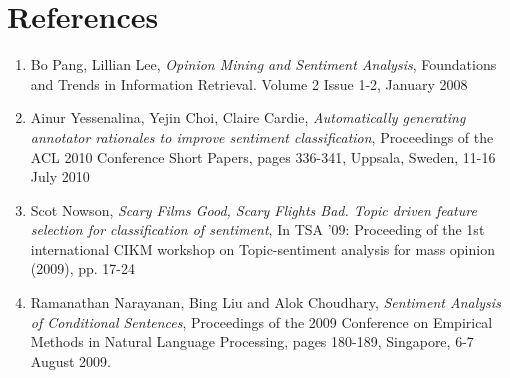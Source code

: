 \documentclass[11pt]{article}
\begin{document}
\section{References}
\begin{enumerate}
\item Bo Pang, Lillian Lee, \emph{Opinion Mining and Sentiment Analysis}, Foundations and Trends in Information Retrieval. Volume 2 Issue 1-2, January 2008
\item Ainur Yessenalina, Yejin Choi, Claire Cardie, \emph{Automatically generating annotator rationales to improve sentiment classification}, Proceedings of the ACL 2010 Conference Short Papers, pages 336-341, Uppsala, Sweden, 11-16 July 2010
\item Scot Nowson, \emph{Scary Films Good, Scary Flights Bad. Topic driven feature selection for classification of sentiment}, In TSA '09: Proceeding of the 1st international CIKM workshop on Topic-sentiment analysis for mass opinion (2009), pp. 17-24
\item Ramanathan Narayanan, Bing Liu and Alok Choudhary, \emph{Sentiment Analysis of Conditional Sentences}, Proceedings of the 2009 Conference on Empirical Methods in Natural Language Processing, pages 180-189, Singapore, 6-7 August 2009.
\end{enumerate}
\end{document}
